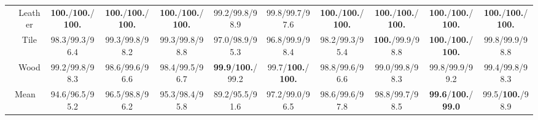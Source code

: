 \documentclass{article}
\theoremstyle{plain}
\theoremstyle{definition}
\theoremstyle{remark}
\begin{document}
\begin{table}[h]
{\begin{tabular}{cccccccccc>{\columncolor{oursblue}}c}
& Leather & \textbf{100.}/\textbf{100.}/\textbf{100.} & \textbf{100.}/\textbf{100.}/\textbf{100.} & \textbf{100.}/\textbf{100.}/\textbf{100.} & 99.2/99.8/98.9 & 99.8/99.7/97.6 & \textbf{100.}/\textbf{100.}/\textbf{100.} & \textbf{100.}/\textbf{100.}/\textbf{100.} & \textbf{100.}/\textbf{100.}/\textbf{100.} & \textbf{100.}/\textbf{100.}/\textbf{100.} \\

& \cellcolor{rowgray} Tile & \cellcolor{rowgray} 98.3/99.3/96.4 & \cellcolor{rowgray} 99.3/99.8/98.2 & \cellcolor{rowgray} 99.3/99.8/98.8 & \cellcolor{rowgray} 97.0/98.9/95.3 & \cellcolor{rowgray} 96.8/99.9/98.4 & \cellcolor{rowgray} 98.2/99.3/95.4 & \cellcolor{rowgray} \textbf{100.}/99.9/98.8 & \cellcolor{rowgray} \textbf{100.}/\textbf{100.}/\textbf{100.} & 99.8/99.9/98.8 \\

& Wood       & 99.2/99.8/98.3 & 98.6/99.6/96.6 & 98.4/99.5/96.7 & \textbf{99.9}/\textbf{100.}/99.2 & 99.7/\textbf{100.}/\textbf{100.} & 98.8/99.6/96.6 & 99.0/99.8/98.3 & 99.8/99.9/99.2 & 99.4/99.8/98.3 \\

\midrule
\multicolumn{2}{c}{\cellcolor{rowgray} Mean} & \cellcolor{rowgray} 94.6/96.5/95.2 & \cellcolor{rowgray} 96.5/98.8/96.2 & \cellcolor{rowgray} 95.3/98.4/95.8 & \cellcolor{rowgray} 89.2/95.5/91.6 & \cellcolor{rowgray} 97.2/99.0/96.5 & \cellcolor{rowgray} 98.6/99.6/97.8 & \cellcolor{rowgray} 98.8/99.7/98.5 & \cellcolor{rowgray} \textbf{99.6}/\textbf{100.}/\textbf{99.0} & 99.5/\textbf{100.}/98.9 \\
\bottomrule
\end{tabular}
}
\end{table}
\end{document}
